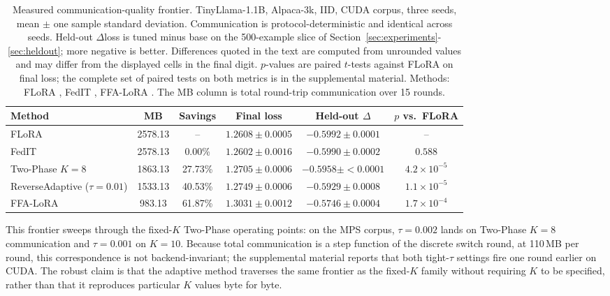 \begin{table}[t]
\caption{Measured communication-quality frontier. TinyLlama-1.1B, Alpaca-3k, IID, CUDA corpus, three seeds, mean $\pm$ one sample standard deviation. Communication is protocol-deterministic and identical across seeds. Held-out $\Delta$loss is tuned minus base on the 500-example slice of Section~\ref{sec:experiments}-\ref{sec:heldout}; more negative is better. Differences quoted in the text are computed from unrounded values and may differ from the displayed cells in the final digit. $p$-values are paired $t$-tests against FLoRA on final loss; the complete set of paired tests on both metrics is in the supplemental material. Methods: FLoRA \cite{wang2024flora}, FedIT \cite{zhang2024federatedgpt}, FFA-LoRA \cite{sun2024ffalora}. The MB column is total round-trip communication over 15 rounds.}
\label{tab:frontier}
\begin{center}
\setlength{\tabcolsep}{6pt}
\begin{tabular}{lccccc}
\toprule
Method & MB & Savings & Final loss & Held-out $\Delta$ & $p$ vs.\ FLoRA \\
\midrule
FLoRA                                 & 2578.13 & --      & $1.2608 \pm 0.0005$ & $-0.5992 \pm 0.0001$ & -- \\
FedIT                                 & 2578.13 & 0.00\%  & $1.2602 \pm 0.0016$ & $-0.5990 \pm 0.0002$ & $0.588$ \\
Two-Phase $K{=}8$                   & 1863.13 & 27.73\% & $1.2705 \pm 0.0006$ & $-0.5958 \pm {<}0.0001$ & $4.2 \times 10^{-5}$ \\
ReverseAdaptive ($\tau{=}0.01$)     & 1533.13 & 40.53\% & $1.2749 \pm 0.0006$ & $-0.5929 \pm 0.0008$ & $1.1 \times 10^{-5}$ \\
FFA-LoRA                             & \phantom{0}983.13 & 61.87\% & $1.3031 \pm 0.0012$ & $-0.5746 \pm 0.0004$ & $1.7 \times 10^{-4}$ \\
\bottomrule
\end{tabular}
\end{center}
\end{table}

This frontier sweeps through the fixed-$K$ Two-Phase operating points: on the MPS corpus, $\tau{=}0.002$ lands on Two-Phase $K{=}8$ communication and $\tau{=}0.001$ on $K{=}10$. Because total communication is a step function of the discrete switch round, at 110\,MB per round, this correspondence is not backend-invariant; the supplemental material reports that both tight-$\tau$ settings fire one round earlier on CUDA. The robust claim is that the adaptive method traverses the same frontier as the fixed-$K$ family without requiring $K$ to be specified, rather than that it reproduces particular $K$ values byte for byte.

